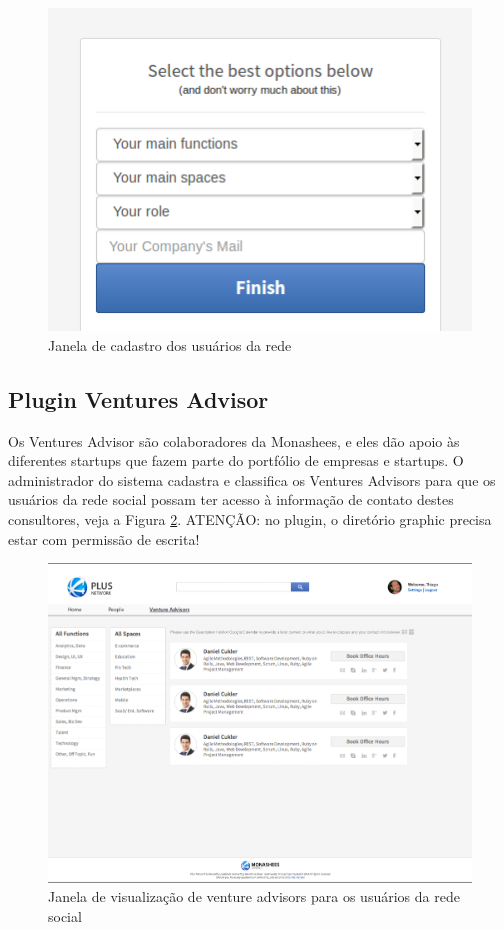 \documentclass[12pt, letterpaper, onecolumn]{article}
\begin{document}
\begin{figure}[htpb]
\centering
\includegraphics[scale=.5]{images/filters.png}
\caption{Janela de cadastro dos usuários da rede}
\label{fig:filters}
\end{figure}

\subsection{Plugin Ventures Advisor}
Os Ventures Advisor são colaboradores da Monashees, e eles dão apoio às diferentes startups que fazem parte do portfólio de empresas e startups. O administrador do sistema cadastra e classifica os Ventures Advisors para que os usuários da rede social possam ter acesso à informação de contato destes consultores, veja a Figura \ref{fig:VA}. ATENÇÃO: no plugin, o diretório graphic precisa estar com permissão de escrita!

\begin{figure}[htpb]
\centering
\includegraphics[scale=.325]{images/ventureAdvisor.png}
\caption{Janela de visualização de venture advisors para os usuários da rede social}
\label{fig:VA}
\end{figure}
\end{document}
